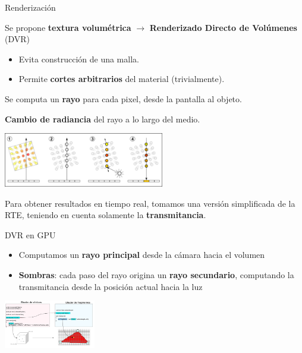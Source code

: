 \documentclass[spanish,unknownkeysallowed,10pt]{beamer}
\begin{document}
\begin{frame}{Renderización}

Se propone \textbf{textura volumétrica} $\rightarrow$ \textbf{Renderizado Directo de Volúmenes} (DVR)

\begin{itemize}
\item Evita construcción de una malla.
\item Permite \textbf{cortes arbitrarios} del material (trivialmente).
\end{itemize}

Se computa un \textbf{rayo} para cada pixel, desde la pantalla al objeto.

\textbf{Cambio de radiancia} del rayo a lo largo del medio.


\centerline{\includegraphics[width=7cm]{../figures/dvr}}

Para obtener resultados en tiempo real, tomamos una versión simplificada de la RTE, teniendo en cuenta solamente la \textbf{transmitancia}.
\end{frame}
\begin{frame}{DVR en GPU}

\begin{itemize}
\item Computamos un \textbf{rayo principal} desde la cámara hacia el volumen
\item \textbf{Sombras}: cada paso del rayo origina un \textbf{rayo secundario}, computando la transmitancia desde la posición actual hacia la luz
\end{itemize}

\centerline{\includegraphics[width=4cm]{../figures/fragmentshader}}

\end{frame}
\end{document}
